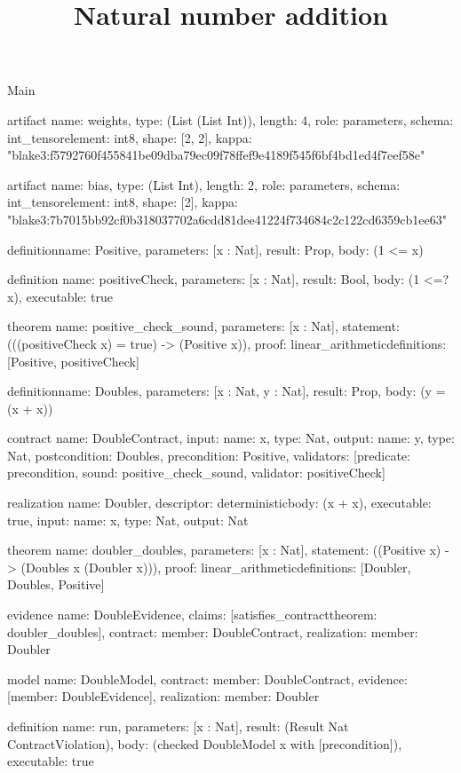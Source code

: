 \begin{lexlean}{Main}
\title{Natural number addition}
\begin{semanticmodule}
artifact{
  name: weights,
  type: (List (List Int)),
  length: 4,
  role: parameters,
  schema: int_tensor{element: int8, shape: [2, 2]},
  kappa: "blake3:f5792760f455841be09dba79ec09f78ffef9e4189f545f6bf4bd1ed4f7eef58e"
}

artifact{
  name: bias,
  type: (List Int),
  length: 2,
  role: parameters,
  schema: int_tensor{element: int8, shape: [2]},
  kappa: "blake3:7b7015bb92cf0b318037702a6cdd81dee41224f734684c2c122cd6359cb1ee63"
}

definition{name: Positive, parameters: [x : Nat], result: Prop, body: (1 <= x)}

definition{
  name: positiveCheck,
  parameters: [x : Nat],
  result: Bool,
  body: (1 <=? x),
  executable: true
}

theorem{
  name: positive_check_sound,
  parameters: [x : Nat],
  statement: (((positiveCheck x) = true) -> (Positive x)),
  proof: linear_arithmetic{definitions: [Positive, positiveCheck]}
}

definition{name: Doubles, parameters: [x : Nat, y : Nat], result: Prop, body: (y = (x + x))}

contract{
  name: DoubleContract,
  input: {name: x, type: Nat},
  output: {name: y, type: Nat},
  postcondition: Doubles,
  precondition: Positive,
  validators: [{predicate: precondition, sound: positive_check_sound, validator: positiveCheck}]
}

realization{
  name: Doubler,
  descriptor: deterministic{body: (x + x)},
  executable: true,
  input: {name: x, type: Nat},
  output: Nat
}

theorem{
  name: doubler_doubles,
  parameters: [x : Nat],
  statement: ((Positive x) -> (Doubles x (Doubler x))),
  proof: linear_arithmetic{definitions: [Doubler, Doubles, Positive]}
}

evidence{
  name: DoubleEvidence,
  claims: [satisfies_contract{theorem: doubler_doubles}],
  contract: {member: DoubleContract},
  realization: {member: Doubler}
}

model{
  name: DoubleModel,
  contract: {member: DoubleContract},
  evidence: [{member: DoubleEvidence}],
  realization: {member: Doubler}
}

definition{
  name: run,
  parameters: [x : Nat],
  result: (Result Nat ContractViolation),
  body: (checked DoubleModel x with [precondition]),
  executable: true
}


\end{semanticmodule}
\end{lexlean}
